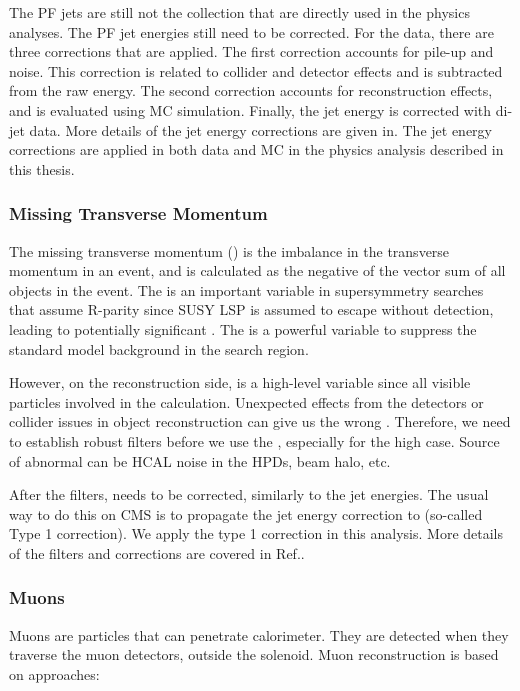 The PF jets are still not the collection that are directly used in the physics analyses. The PF jet energies still need to be corrected. For the data, there are three corrections that are applied. The first correction accounts for pile-up and noise. This correction is related to collider and detector effects and is subtracted from the raw energy. The second correction accounts for reconstruction effects, and is evaluated using MC simulation. Finally, the jet energy is corrected with di-jet data. More details of the jet energy corrections are given in\cite{1748-0221-6-11-P11002}. The jet energy corrections are applied in both data and MC in the physics analysis described in this thesis. 

\subsubsection{Missing Transverse Momentum}

The missing transverse momentum (\MET) is the imbalance in the transverse momentum in an event, and is calculated as the negative of the vector sum of all objects in the event. The \MET is an important variable in supersymmetry searches that assume R-parity since SUSY LSP is assumed to escape without detection, leading to potentially significant \MET. The \MET is a powerful variable to suppress the standard model background in the search region. 

However, on the reconstruction side, \MET is a high-level variable since all visible particles involved in the calculation. Unexpected effects from the detectors or collider issues in object reconstruction can give us the wrong \MET. Therefore, we need to establish robust \MET filters before we use the \MET, especially for the high \MET case. Source of abnormal \MET can be HCAL noise in the HPDs, beam halo, etc. 

After the filters, \MET needs to be corrected, similarly to the jet energies. The usual way to do this on CMS is to propagate the jet energy correction to \MET (so-called Type 1 correction). We apply the type 1 correction in this analysis. More details of the \MET filters and corrections are covered in Ref.\cite{CMS-PAS-JME-16-004}. 


\subsubsection{Muons}
Muons are particles that can penetrate calorimeter.  They are detected when they traverse the muon detectors, outside the solenoid. Muon reconstruction is based on approaches: 

